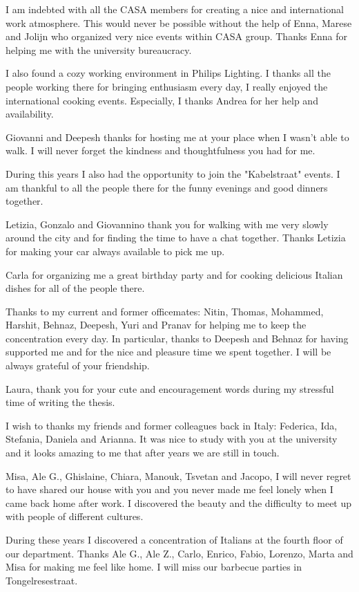 I am indebted with all the CASA members for creating a nice and international work atmosphere. This would never be possible without the help of Enna, Marese and Jolijn who organized very nice events within CASA group. Thanks Enna for helping me with the university bureaucracy.

I also found a cozy working environment in Philips Lighting. I thanks all the people working there for bringing enthusiasm every day, I really enjoyed the international cooking events. Especially, I thanks Andrea for her help and availability.

Giovanni and Deepesh thanks for hosting me at your place when I wasn't able to walk. I will never forget the kindness and thoughtfulness you had for me.

During this years I also had the opportunity to join the "Kabelstraat" events. I am thankful to all the people there for the funny evenings and good dinners together.

Letizia, Gonzalo and Giovannino thank you for walking with me very slowly around the city and for finding the time to have a chat together. Thanks Letizia for making your car always available to pick me up.

Carla for organizing me a great birthday party and for cooking delicious Italian dishes for all of the people there.

Thanks to my current and former officemates: Nitin, Thomas, Mohammed, Harshit, Behnaz, Deepesh, Yuri and Pranav for helping me to keep the concentration every day.
In particular, thanks to Deepesh and Behnaz for having supported me and for the nice and pleasure time we spent together. I will be always grateful of your friendship. 

Laura, thank you for your cute and encouragement words during my stressful time of writing the thesis.

I wish to thanks my friends and former colleagues back in Italy: Federica, Ida, Stefania, Daniela and Arianna. It was nice to study with you at the university and it looks amazing to me that after years we are still in touch.

Misa, Ale G., Ghislaine, Chiara, Manouk, Tsvetan and Jacopo, I will never regret to have shared our house with you and you never made me feel lonely when I came back home after work. I discovered the beauty and the difficulty to meet up with people of different cultures.

During these years I discovered a concentration of Italians at the fourth floor of our department. Thanks Ale G., Ale Z., Carlo, Enrico, Fabio, Lorenzo, Marta and Misa for making me feel like home. I will miss our barbecue parties in Tongelresestraat.

